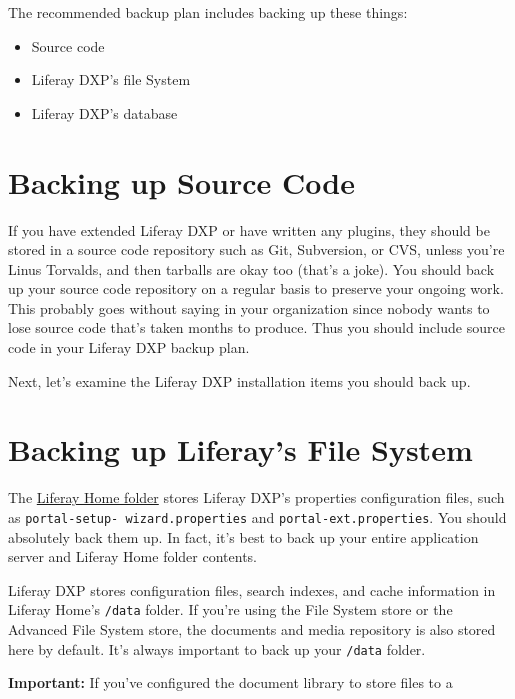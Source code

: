 The recommended backup plan includes backing up these things:

\begin{itemize}
\tightlist
\item
  Source code
\item
  Liferay DXP's file System
\item
  Liferay DXP's database
\end{itemize}

\section{Backing up Source Code}\label{backing-up-source-code}

If you have extended Liferay DXP or have written any plugins, they
should be stored in a source code repository such as Git, Subversion, or
CVS, unless you're Linus Torvalds, and then tarballs are okay too
(that's a joke). You should back up your source code repository on a
regular basis to preserve your ongoing work. This probably goes without
saying in your organization since nobody wants to lose source code
that's taken months to produce. Thus you should include source code in
your Liferay DXP backup plan.

Next, let's examine the Liferay DXP installation items you should back
up.

\section{Backing up Liferay's File
System}\label{backing-up-liferays-file-system}

The
\href{/docs/7-0/deploy/-/knowledge_base/d/installing-product\#liferay-home}{Liferay
Home folder} stores Liferay DXP's properties configuration files, such
as \texttt{portal-setup-\ wizard.properties} and
\texttt{portal-ext.properties}. You should absolutely back them up. In
fact, it's best to back up your entire application server and Liferay
Home folder contents.

Liferay DXP stores configuration files, search indexes, and cache
information in Liferay Home's \texttt{/data} folder. If you're using the
File System store or the Advanced File System store, the documents and
media repository is also stored here by default. It's always important
to back up your \texttt{/data} folder.

\noindent\hrulefill

\textbf{Important:} If you've configured the document library to store
files to a


